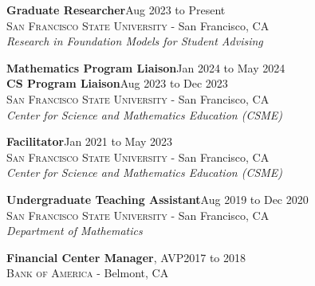 \documentclass[hidelinks, 10pt]{article}
\def\contentblockspacing{2.5mm}     %
\begin{document}
\vspace{\contentblockspacing}

\begin{minipage}[ct]{0.9\linewidth}
    \textbf{Graduate Researcher}\hfill Aug 2023 to Present\\
    {\textsc{San Francisco State University} - San Francisco, CA}\\
    \textit{Research in Foundation Models for Student Advising}
\end{minipage}

\vspace{\contentblockspacing}

\begin{minipage}[ct]{0.9\linewidth}
    \textbf{Mathematics Program Liaison}\hfill Jan 2024 to May 2024\\
    \textbf{CS Program Liaison}\hfill Aug 2023 to Dec 2023\\
    {\textsc{San Francisco State University} - San Francisco, CA}\\
    \textit{Center for Science and Mathematics Education (CSME)}
\end{minipage}

\vspace{\contentblockspacing}

\begin{minipage}[ct]{0.9\linewidth}
    \textbf{Facilitator}\hfill Jan 2021 to May 2023\\
    {\textsc{San Francisco State University} - San Francisco, CA}\\
    \textit{Center for Science and Mathematics Education (CSME)}
\end{minipage}

\vspace{\contentblockspacing}

\begin{minipage}[ct]{0.9\linewidth}
    \textbf{Undergraduate Teaching Assistant}\hfill Aug 2019 to Dec 2020\\
    {\textsc{San Francisco State University} - San Francisco, CA}\\
    \textit{Department of Mathematics}
\end{minipage}

\vspace{\contentblockspacing}

\begin{minipage}[ct]{0.9\linewidth}
    \textbf{Financial Center Manager}, AVP\hfill 2017 to 2018\\
    {\textsc{Bank of America} - Belmont, CA}
\end{minipage}
\end{document}
